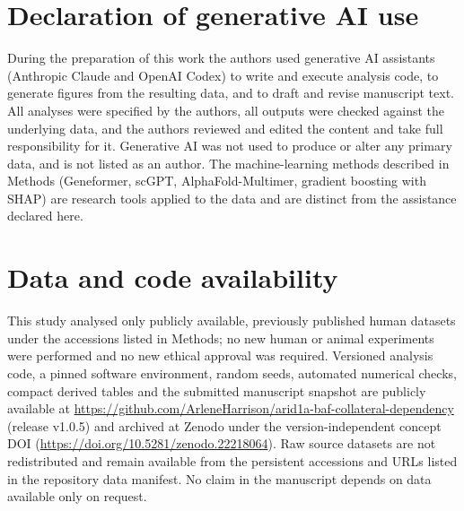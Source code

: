 \documentclass[11pt,a4paper]{article}
\begin{document}
\section*{Declaration of generative AI use}
During the preparation of this work the authors used generative AI assistants
(Anthropic Claude and OpenAI Codex) to write and execute analysis code, to generate figures from
the resulting data, and to draft and revise manuscript text. All analyses were
specified by the authors, all outputs were checked against the underlying data,
and the authors reviewed and edited the content and take full responsibility
for it. Generative AI was not used to produce or alter any primary data, and is
not listed as an author. The machine-learning methods described in Methods
(Geneformer, scGPT, AlphaFold-Multimer, gradient boosting with SHAP) are
research tools applied to the data and are distinct from the assistance
declared here.

\section*{Data and code availability}
This study analysed only publicly available, previously published human datasets
under the accessions listed in Methods; no new human or animal experiments were
performed and no new ethical approval was required.
Versioned analysis code, a pinned software environment, random seeds, automated
numerical checks, compact derived tables and the submitted manuscript snapshot
are publicly available at
\url{https://github.com/ArleneHarrison/arid1a-baf-collateral-dependency}
(release v1.0.5) and archived at Zenodo under the version-independent concept DOI
(\url{https://doi.org/10.5281/zenodo.22218064}). Raw
source datasets are not redistributed and remain available from the persistent
accessions and URLs listed in the repository data manifest. No claim in the
manuscript depends on data available only on request.

{\small


}

\end{document}
